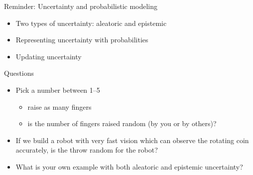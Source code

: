 \documentclass[english,t]{beamer}
\begin{document}
\begin{frame}{Reminder: Uncertainty and probabilistic modeling}

  \begin{itemize}
  \item Two types of uncertainty: aleatoric and epistemic
    \vspace{\baselineskip}
  \item Representing uncertainty with probabilities
    \vspace{\baselineskip}
  \item Updating uncertainty
    \vspace{\baselineskip}
   \end{itemize}
\end{frame}

\begin{frame}{Questions}

  \begin{itemize}
  \item<1-> Pick a number between 1--5
    \begin{itemize}
    \item<2-> raise as many fingers 
    \item<3-> is the number of fingers raised random (by you or by others)?
    \end{itemize}
    \vspace{\baselineskip}
  \item<4-> If we build a robot with very fast vision which can observe
    the rotating coin accurately, is the throw random for the robot?
    \vspace{\baselineskip}
  \item<5-> What is your own example with both aleatoric and epistemic
    uncertainty?
  \end{itemize}
\end{frame}
\end{document}
